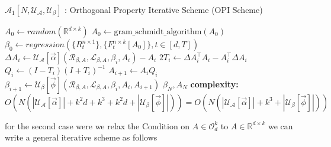 \begin{algorithm}[H]
\caption{$\mathcal{A}_{1}[N,\mathcal{U_{A}},\mathcal{U_{\beta}}]$ : Orthogonal Property Iterative Scheme (OPI Scheme)}\label{lfm_orthogonal_property_iterative_scheme}
\begin{algorithmic}[1]
\State $A_{0} \gets random(\mathbb{R}^{d\times k}) $
\State $A_{0} \gets \text{gram\_schmidt\_algorithm}(A_0)$
\State $\beta_0 \gets regression(\{R^{n\times 1}_{t}\},\{F^{n\times k}_{t}[A_0]\}, t\in [d,T])$
    \State $ \Delta A_i \gets \mathcal{U_{A}}[\vec{\alpha}](\mathcal{R}_{\beta, A},\mathcal{L}_{\beta, A},\beta_i,A_i)-A_i$
    \State $2T_i \gets \Delta A_i^\top A_i- A_i^\top \Delta A_i$
    \State $Q_i \gets (I-T_i)(I+T_i)^{-1}$
    \State $A_{i+1} \gets A_iQ_i$
    \State $\beta_{i+1} \gets \mathcal{U_{\beta}}[\vec{\phi}](\mathcal{R}_{\beta, A},\mathcal{L}_{\beta, A},\beta_{i}, A_{i}, A_{i+1})$
\EndFor
\State \Return $\beta_{N},A_{N}$
\State \textbf{complexity: } $O(N(|\mathcal{U_{A}}[\vec{\alpha}]|+k^2d+k^3+k^2d+|\mathcal{U_{\beta}}[\vec{\phi}]|)) =O(N(|\mathcal{U_{A}}[\vec{\alpha}]|+k^3+|\mathcal{U_{\beta}}[\vec{\phi}]|)) $
\end{algorithmic}
\end{algorithm} for the second case were we relax the Condition on $A \in \mathcal{O}_d^k$ to $A \in \mathbb{R}^{d\times k}$ we can write a general iterative scheme as follows
